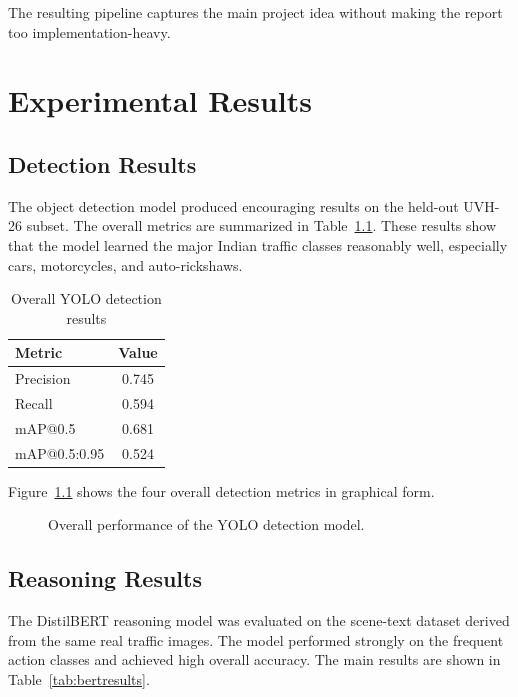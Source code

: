 \documentclass[12pt,a4paper]{report}
\begin{document}
The resulting pipeline captures the main project idea without making the report too implementation-heavy.

\chapter{Experimental Results}
\section*{Detection Results}
The object detection model produced encouraging results on the held-out UVH-26 subset. The overall metrics are summarized in Table~\ref{tab:yoloresults}. These results show that the model learned the major Indian traffic classes reasonably well, especially cars, motorcycles, and auto-rickshaws.

\begin{table}[H]
\centering
\caption{Overall YOLO detection results}
\label{tab:yoloresults}
\begin{tabular}{lc}
\toprule
\textbf{Metric} & \textbf{Value} \\
\midrule
Precision & 0.745 \\
Recall & 0.594 \\
mAP@0.5 & 0.681 \\
mAP@0.5:0.95 & 0.524 \\
\bottomrule
\end{tabular}
\end{table}

Figure~\ref{fig:detgraph} shows the four overall detection metrics in graphical form.

\begin{figure}[H]
\centering
{}
\caption{Overall performance of the YOLO detection model.}
\label{fig:detgraph}
\end{figure}

\section*{Reasoning Results}
The DistilBERT reasoning model was evaluated on the scene-text dataset derived from the same real traffic images. The model performed strongly on the frequent action classes and achieved high overall accuracy. The main results are shown in Table~\ref{tab:bertresults}.
\end{document}

